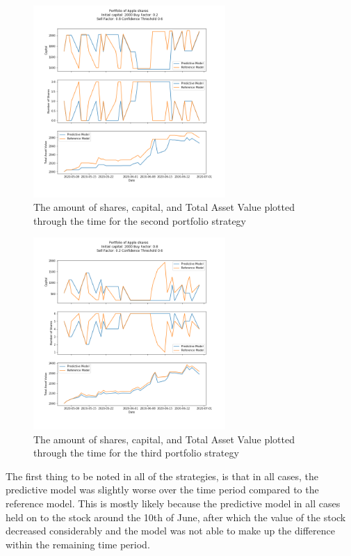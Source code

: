 \begin{figure}[H]
	\centering
	\includegraphics[width=0.65\textwidth]{images/portfolio_2.png}
	\caption{The amount of shares, capital, and Total Asset Value plotted through the time for the second portfolio strategy}
	\label{fig:port_2}
\end{figure}

\begin{figure}[H]
	\centering
	\includegraphics[width=0.65\textwidth]{images/portfolio_3.png}
	\caption{The amount of shares, capital, and Total Asset Value plotted through the time for the third portfolio strategy}
	\label{fig:port_3}
\end{figure}

The first thing to be noted in all of the strategies, is that in all cases, the predictive model was slightly worse over the time period compared to the reference model. This is mostly likely because the predictive model in all cases held on to the stock around the 10th of June, after which the value of the stock decreased considerably and the model was not able to make up the difference within the remaining time period. 

